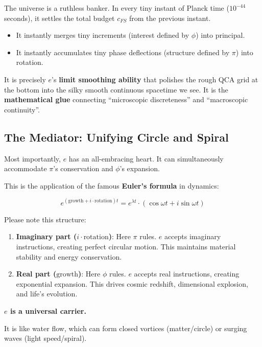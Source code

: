 The universe is a ruthless banker. In every tiny instant of Planck time ($10^{-44}$ seconds), it settles the total budget $c_{FS}$ from the previous instant.

\begin{itemize}
\item It instantly merges tiny increments (interest defined by $\phi$) into principal.

\item It instantly accumulates tiny phase deflections (structure defined by $\pi$) into rotation.
\end{itemize}

It is precisely $e$'s \textbf{limit smoothing ability} that polishes the rough QCA grid at the bottom into the silky smooth continuous spacetime we see. It is the \textbf{mathematical glue} connecting ``microscopic discreteness'' and ``macroscopic continuity''.

\subsection{The Mediator: Unifying Circle and Spiral}

Most importantly, $e$ has an all-embracing heart. It can simultaneously accommodate $\pi$'s conservation and $\phi$'s expansion.

This is the application of the famous \textbf{Euler's formula} in dynamics:

\[e^{(\text{growth} + i \cdot \text{rotation})t} = e^{\lambda t} \cdot (\cos \omega t + i \sin \omega t)\]

Please note this structure:

\begin{enumerate}
\item \textbf{Imaginary part ($i \cdot \text{rotation}$)}: Here \textbf{$\pi$} rules. $e$ accepts imaginary instructions, creating perfect circular motion. This maintains material stability and energy conservation.

\item \textbf{Real part ($\text{growth}$)}: Here \textbf{$\phi$} rules. $e$ accepts real instructions, creating exponential expansion. This drives cosmic redshift, dimensional explosion, and life's evolution.
\end{enumerate}

\textbf{$e$ is a universal carrier.}

It is like water flow, which can form closed vortices (matter/circle) or surging waves (light speed/spiral).

